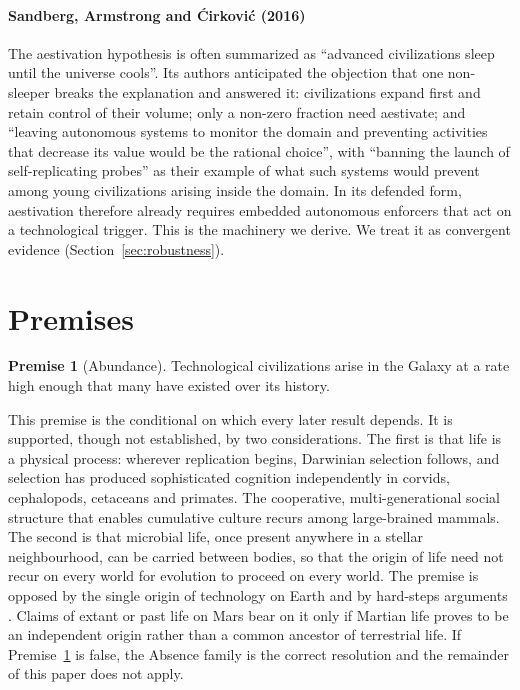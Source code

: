 \documentclass[preprint,12pt]{elsarticle}
\theoremstyle{definition}
\newtheorem{premise}{Premise}
\begin{document}
\paragraph{Sandberg, Armstrong and \'Cirkovi\'c (2016)}
The aestivation hypothesis \citep{Sandberg2017} is often summarized as ``advanced civilizations sleep until the universe cools''. Its authors anticipated the objection that one non-sleeper breaks the explanation and answered it: civilizations expand first and retain control of their volume; only a non-zero fraction need aestivate; and ``leaving autonomous systems to monitor the domain and preventing activities that decrease its value would be the rational choice'', with ``banning the launch of self-replicating probes'' as their example of what such systems would prevent among young civilizations arising inside the domain. In its defended form, aestivation therefore already requires embedded autonomous enforcers that act on a technological trigger. This is the machinery we derive. We treat it as convergent evidence (Section~\ref{sec:robustness}).

\section{Premises}
\label{sec:premises}

\begin{premise}[Abundance]
\label{p:abundance}
Technological civilizations arise in the Galaxy at a rate high enough that many have existed over its history.
\end{premise}

This premise is the conditional on which every later result depends. It is supported, though not established, by two considerations. The first is that life is a physical process: wherever replication begins, Darwinian selection follows, and selection has produced sophisticated cognition independently in corvids, cephalopods, cetaceans and primates. The cooperative, multi-generational social structure that enables cumulative culture \citep{Hrdy2009} recurs among large-brained mammals. The second is that microbial life, once present anywhere in a stellar neighbourhood, can be carried between bodies, so that the origin of life need not recur on every world for evolution to proceed on every world. The premise is opposed by the single origin of technology on Earth and by hard-steps arguments \citep{Carter1983,SnyderBeattie2021}. Claims of extant or past life on Mars \citep{Benner2026} bear on it only if Martian life proves to be an independent origin rather than a common ancestor of terrestrial life. If Premise~\ref{p:abundance} is false, the Absence family is the correct resolution and the remainder of this paper does not apply.
\end{document}
